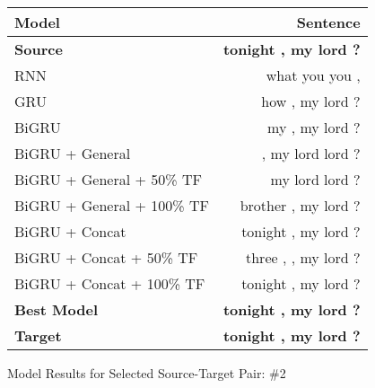 \documentclass[twoside,twocolumn]{article}
\newlength\mystoreparindent
\newenvironment{myparindent}[1]{%
  \setlength{\mystoreparindent}{\the\parindent}
  \setlength{\parindent}{#1}
  }{%
  \setlength{\parindent}{\mystoreparindent}
}
\begin{document}
\begin{myparindent}{0pt}
\begin{figure}[ht!]
    \centering
    \begin{tabular}{ |l|r| }
        \hline
        \textbf{Model}
          & \textbf{Sentence} \\
        \hline
        \textbf{Source} & \textbf{tonight , my lord ?} \\ \hline
        RNN & what you you , \\ \hline
        GRU & how , my lord ? \\ \hline
        BiGRU & my , my lord ? \\ \hline
        BiGRU + General & , my lord lord ? \\ \hline
        BiGRU + General + 50\% TF & my lord lord ? \\ \hline
        BiGRU + General + 100\% TF & brother , my lord ? \\ \hline
        BiGRU + Concat & tonight , my lord ? \\ \hline
        BiGRU + Concat + 50\% TF & three , , my lord ? \\ \hline
        BiGRU + Concat + 100\% TF & tonight , my lord ? \\ \hline
        \textbf{Best Model} & \textbf{tonight , my lord ?} \\ \hline
        \textbf{Target} & \textbf{tonight , my lord ?} \\ \hline
    \end{tabular}
    \caption{Model Results for Selected Source-Target Pair: \#2}
    \label{fig:model-results-2}
\end{figure}


\end{myparindent}
\end{document}

